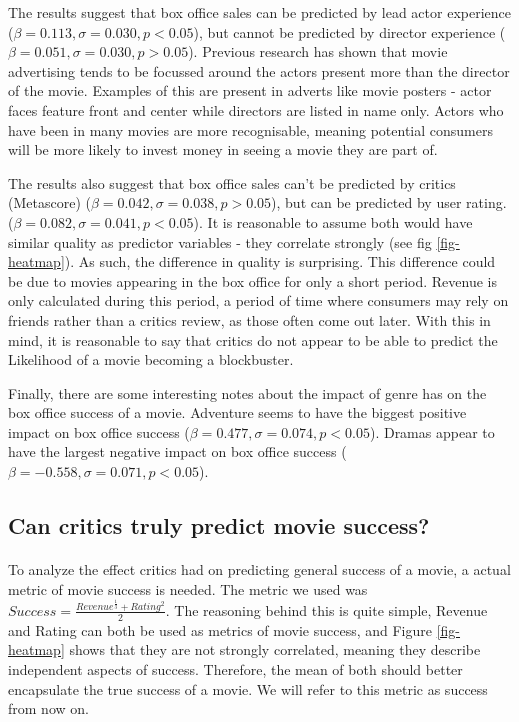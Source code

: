         The results suggest that box office sales can be predicted by lead actor experience ($\beta=0.113, \sigma=0.030, p<0.05$),
            but cannot be predicted by director experience ($\beta=0.051, \sigma=0.030, p>0.05$).
        Previous research has shown that movie advertising tends to be focussed around the actors 
            present more than the director of the movie\cite{label}.
        Examples of this are present in adverts like movie posters - actor faces feature front and 
            center while directors are listed in name only.
        Actors who have been in many movies are more recognisable, meaning potential consumers
            will be more likely to invest money in seeing a movie they are part of.

        The results also suggest that box office sales can't be predicted by critics (Metascore) 
            ($\beta=0.042, \sigma=0.038, p>0.05$), but can be predicted by user rating.
            ($\beta=0.082, \sigma=0.041, p<0.05$).
        It is reasonable to assume both would have similar quality as predictor variables - they 
            correlate strongly (see fig \ref{fig-heatmap}).
        As such, the difference in quality is surprising.
        This difference could be due to movies appearing in the box office for only a short period.
        Revenue is only calculated during this period, a period of time where consumers may 
            rely on friends rather than a critics review, as those often come out later.
        With this in mind, it is reasonable to say that critics do not appear to be able to predict the Likelihood
            of a movie becoming a blockbuster.
        
        Finally, there are some interesting notes about the impact of genre has on the box office success of a movie.
        Adventure seems to have the biggest positive impact on box office success ($\beta=0.477,\sigma=0.074,p<0.05$).
        Dramas appear to have the largest negative impact on box office success ($\beta=-0.558,\sigma=0.071,p<0.05$).
    \subsection{Can critics truly predict movie success?}
        \paragraph{}
        To analyze the effect critics had on predicting general success of a movie, a actual metric of movie success is
            needed.
        The metric we used was $Success = \frac{Revenue^\frac{1}{3} + Rating^2}{2}$.
        The reasoning behind this is quite simple, Revenue and Rating can both be used as metrics of movie success,
            and Figure \ref{fig-heatmap} shows that they are not strongly correlated, meaning they describe independent
            aspects of success. 
        Therefore, the mean of both should better encapsulate the true success of a movie.
        We will refer to this metric as success from now on.
        
